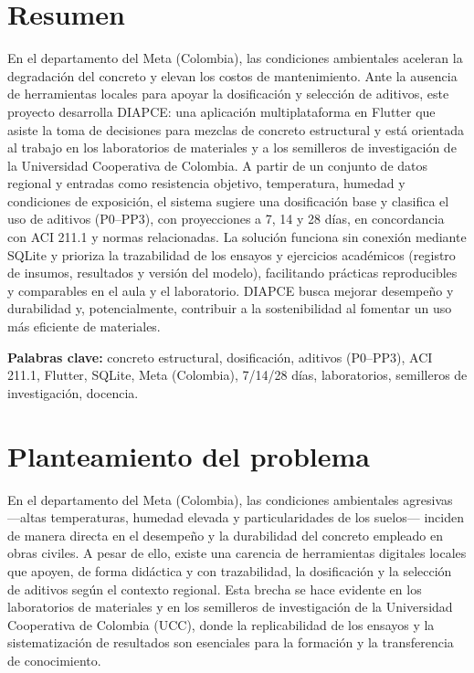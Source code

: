 \documentclass[12pt, letterpaper]{article}
\begin{document}
\newpage
{}
\setcounter{page}{1}
\section{Resumen}

En el departamento del Meta (Colombia), las condiciones ambientales aceleran la degradación del concreto y elevan los costos de mantenimiento. Ante la ausencia de herramientas locales para apoyar la dosificación y selección de aditivos, este proyecto desarrolla DIAPCE: una aplicación multiplataforma en Flutter que asiste la toma de decisiones para mezclas de concreto estructural y está orientada al trabajo en los laboratorios de materiales y a los semilleros de investigación de la Universidad Cooperativa de Colombia. A partir de un conjunto de datos regional y entradas como resistencia objetivo, temperatura, humedad y condiciones de exposición, el sistema sugiere una dosificación base y clasifica el uso de aditivos (P0–PP3), con proyecciones a 7, 14 y 28 días, en concordancia con ACI 211.1 y normas relacionadas. La solución funciona sin conexión mediante SQLite y prioriza la trazabilidad de los ensayos y ejercicios académicos (registro de insumos, resultados y versión del modelo), facilitando prácticas reproducibles y comparables en el aula y el laboratorio. DIAPCE busca mejorar desempeño y durabilidad y, potencialmente, contribuir a la sostenibilidad al fomentar un uso más eficiente de materiales.

\vspace{0.5em}
\noindent\textbf{Palabras clave:} concreto estructural, dosificación, aditivos (P0–PP3), ACI 211.1, Flutter, SQLite, Meta (Colombia), 7/14/28 días, laboratorios, semilleros de investigación, docencia.

\newpage
\tableofcontents
\newpage
\listoftables
{}
\newpage
\listoffigures
{}

\newpage
{}
\setcounter{page}{1}


\section{Planteamiento del problema}

En el departamento del Meta (Colombia), las condiciones ambientales agresivas —altas temperaturas, humedad elevada y particularidades de los suelos— inciden de manera directa en el desempeño y la durabilidad del concreto empleado en obras civiles. A pesar de ello, existe una carencia de herramientas digitales locales que apoyen, de forma didáctica y con trazabilidad, la dosificación y la selección de aditivos según el contexto regional. Esta brecha se hace evidente en los laboratorios de materiales y en los semilleros de investigación de la Universidad Cooperativa de Colombia (UCC), donde la replicabilidad de los ensayos y la sistematización de resultados son esenciales para la formación y la transferencia de conocimiento.
\end{document}

